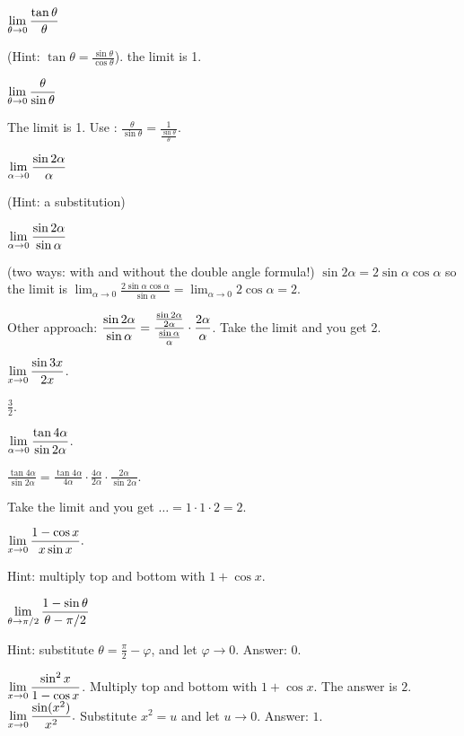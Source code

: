 \begin{multicols}{3}\setlength{\parindent}{0pt}
\problem $\displaystyle \lim_{\theta\to0} \frac{\tan \theta}{\theta}$ 

(Hint: $\tan\theta = \frac{\sin\theta}{\cos \theta}$).
\answer 
the limit is 1.
\endanswer

\problem $\displaystyle \lim_{\theta\to0} \frac{\theta}{\sin \theta}$ 

\answer 
The limit is 1.
Use :
$\frac{\theta}{\sin\theta} = \frac{1}{\frac{\sin\theta}{\theta}}$.
\endanswer

\problem $\displaystyle \lim_{\alpha\to0}\frac{\sin 2\alpha}{\alpha}$ 

(Hint: a substitution)

\problem $\displaystyle \lim_{\alpha\to0}\frac{\sin 2\alpha}{\sin\alpha}$ 

(two ways: with and without the double angle formula!)
\answer 
$\sin 2\alpha = 2\sin\alpha\cos\alpha$ so the limit is
$\lim_{\alpha\to0} \frac{2\sin\alpha\cos\alpha}{\sin\alpha} =
\lim_{\alpha\to0} 2\cos\alpha = 2$.

Other approach: $\displaystyle\frac{\sin2\alpha}{\sin\alpha} =
\frac{\frac{\sin2\alpha}{2\alpha}}{\frac{\sin\alpha}{\alpha}}\cdot
\frac{2\alpha}{\alpha}$. Take the limit and you get 2.
\endanswer

\problem $\displaystyle \lim_{x\to0}\frac{\sin 3x}{2x}$. 

\answer 
$\frac{3}{2}$.
\endanswer



\problem $\displaystyle \lim_{\alpha\to0}\frac{\tan 4\alpha}{\sin 2\alpha}$. 

\answer 
$\frac{\tan 4\alpha}{\sin 2\alpha}
= \frac{\tan 4\alpha}{4\alpha}\cdot
\frac{4\alpha}{2\alpha}\cdot \frac{2\alpha}{\sin2\alpha}$.

Take the limit and you get $\ldots = 1\cdot1\cdot2 = 2$.
\endanswer

\problem $\displaystyle \lim_{x\to 0} \frac{1-\cos x}{ x \sin x}.$ 

\answer 
Hint: multiply top and bottom with \(1+\cos x\).
\endanswer

\problem $\displaystyle\lim_{\theta\to\pi/2}\frac{1-\sin\theta}{\theta-\pi/2}$ 

\answer 
Hint: substitute $\theta = \frac{\pi}{2} - \varphi$, and let $\varphi\to 0$.  Answer: $0$.
\endanswer

\problem $\displaystyle \lim_{x\to0}\frac{\sin^2 x}{1-\cos x}$. 
\answer 
Multiply top and bottom with $1+\cos x$.  The answer is $2$.
\endanswer
\problem $\displaystyle \lim_{x\to0}\frac{\sin(x^2)}{x^2}.$ 
\answer 
Substitute $x^2 = u$ and let $u\to 0$.  Answer: $1$.
\endanswer


\end{multicols}
